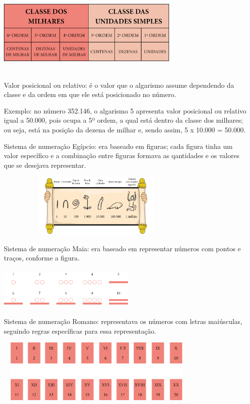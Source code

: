 
\includegraphics[width=3.55128in,height=1.66618in]{media/image1.png}

Valor posicional ou relativo: é o valor que o algarismo assume
dependendo da classe e da ordem em que ele está posicionado no número.

Exemplo: no número 352.146, o algarismo 5 apresenta valor posicional ou
relativo igual a 50.000, pois ocupa a 5º ordem, a qual está dentro da
classe dos milhares; ou seja, está na posição da dezena de milhar e,
sendo assim, 5 x 10.000 = 50.000.

Sistema de numeração Egípcio: era baseado em figuras; cada figura tinha um valor específico e a combinação entre figuras formava as qantidades e os valores que se desejava representar. 

\includegraphics[width=3.98368in,height=1.25011in]{media/image2.png}

Sistema de numeração Maia: era baseado em representar
números com pontos e traços, conforme a figura.

\includegraphics[width=2.66690in,height=0.81674in]{media/image3.png}

Sistema de numeração Romano: representava os números com letras
maiúsculas, seguindo regras específicas para essa representação.

\includegraphics[width=3.97534in,height=1.23344in]{media/image4.png}

